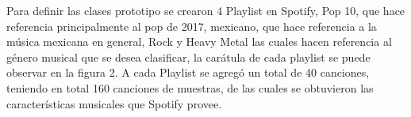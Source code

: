 \documentclass[conference]{IEEEtran}
\begin{document}
Para definir las clases prototipo se crearon 4 Playlist en Spotify, Pop 10, que hace referencia principalmente al pop de 2017, mexicano, que hace referencia a la música mexicana en general, Rock y Heavy Metal las cuales hacen referencia al género musical que se desea clasificar, la carátula de cada playlist se puede observar en la figura 2. A cada Playlist se agregó un total de 40 canciones, teniendo en total 160 canciones de muestras, de las cuales se obtuvieron las características musicales que Spotify provee. \\

\begin{figure}[htbp]
	\centering

\end{figure}
\end{document}
